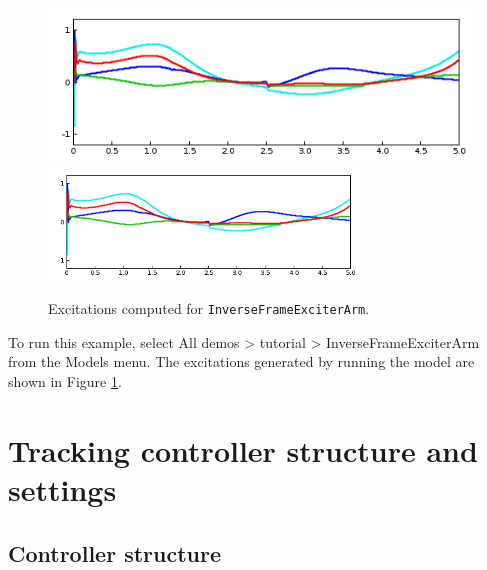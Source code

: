 \begin{figure}[ht]
\begin{center}
   \iflatexml
      \includegraphics[]{images/InverseFrameExciterArmEx}
   \else
      \includegraphics[width=3.25in]{images/InverseFrameExciterArmEx}
   \fi
\end{center}
\caption{Excitations computed for {\tt InverseFrameExciterArm}.}
\label{InverseFrameExciterArmEx:fig}
\end{figure}

To run this example, select {\sf All demos > tutorial > InverseFrameExciterArm}
from the {\sf Models} menu. The excitations generated by
running the model are shown in Figure \ref{InverseFrameExciterArmEx:fig}.



\section{Tracking controller structure and settings}
\label{controllerSettings:sec}

\subsection{Controller structure}


